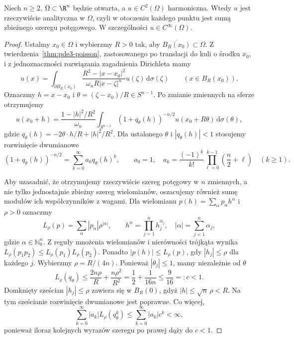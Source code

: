 \begin{twierdzenie}
\label{thm:pde3-analytic}
Niech $n\geq2$, $\Omega\subset\R^n$ będzie otwarta,
a $u\in C^2(\Omega)$ harmoniczna. Wtedy $u$ jest
rzeczywiście analityczna w $\Omega$, czyli w otoczeniu
każdego punktu jest sumą zbieżnego szeregu potęgowego.
W szczególności $u\in C^\infty(\Omega)$.
\end{twierdzenie}
\begin{proof}
Ustalmy $x_0\in\Omega$ i wybierzmy $R>0$ tak, aby
$\overline{B_R(x_0)}\subset\Omega$.
Z twierdzenia~\ref{thm:pde3-poisson}, zastosowanego
po translacji do kuli o środku $x_0$, i z jednoznaczności
rozwiązania zagadnienia Dirichleta mamy
\[
 u(x)=\int_{\partial B_R(x_0)}
 \frac{R^2-|x-x_0|^2}{\omega_n R|x-\zeta|^n}
 u(\zeta)\,\mathrm d\sigma(\zeta)
 \qquad(x\in B_R(x_0)).
\]
Oznaczmy $h=x-x_0$ i $\theta=(\zeta-x_0)/R\in S^{n-1}$.
Po zmianie zmiennych na sferze otrzymujemy
\[
 u(x_0+h)=\frac{1-|h|^2/R^2}{\omega_n}
 \int_{S^{n-1}}(1+q_\theta(h))^{-n/2}
 u(x_0+R\theta)\,\mathrm d\sigma(\theta),
\]
gdzie $q_\theta(h)=-2\theta\cdot h/R+|h|^2/R^2$.
Dla ustalonego $\theta$ i $|q_\theta(h)|<1$ stosujemy
rozwinięcie dwumianowe
\[
 (1+q_\theta(h))^{-n/2}
 =\sum_{k=0}^\infty a_k q_\theta(h)^k,\qquad
 a_0=1,\quad
 a_k=\frac{(-1)^k}{k!}\prod_{\ell=0}^{k-1}
 \left(\frac n2+\ell\right)\quad(k\geq1).
\]

Aby uzasadnić, że otrzymujemy rzeczywiście szereg
potęgowy w $n$ zmiennych, a nie tylko jednostajnie
zbieżny szereg wielomianów, oszacujemy również
sumę modułów ich współczynników z wagami.
Dla wielomianu $p(h)=\sum_\alpha p_\alpha h^\alpha$
i $\rho>0$ oznaczmy
\[
 L_\rho(p)=\sum_\alpha |p_\alpha|\rho^{|\alpha|},
 \qquad h^\alpha=\prod_{j=1}^n h_j^{\alpha_j},
 \quad |\alpha|=\sum_{j=1}^n\alpha_j,
\]
gdzie $\alpha\in\mathbb N_0^n$.
Z reguły mnożenia wielomianów i nierówności trójkąta
wynika $L_\rho(p_1p_2)\leq L_\rho(p_1)L_\rho(p_2)$.
Ponadto $|p(h)|\leq L_\rho(p)$, gdy $|h_j|\leq\rho$
dla każdego $j$. Wybierzmy $\rho=R/(4n)$.
Ponieważ $|\theta_j|\leq1$, mamy niezależnie od $\theta$
\[
 L_\rho(q_\theta)
 \leq\frac{2n\rho}{R}+\frac{n\rho^2}{R^2}
 =\frac12+\frac1{16n}\leq\frac9{16}=:c<1.
\]
Domknięty sześcian $|h_j|\leq\rho$ zawiera się
w $B_R(0)$, gdyż $|h|\leq\sqrt n\,\rho<R$.
Na tym sześcianie rozwinięcie dwumianowe jest poprawne.
Co więcej,
\[
 \sum_{k=0}^\infty |a_k|L_\rho(q_\theta^k)
 \leq\sum_{k=0}^\infty |a_k|c^k<\infty,
\]
ponieważ iloraz kolejnych wyrazów szeregu po prawej
dąży do $c<1$.


\end{proof}
